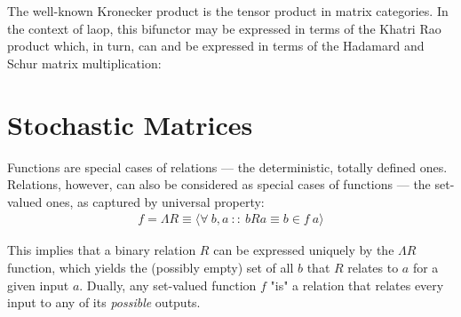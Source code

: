 \documentclass[
  oneside,
  11pt, a4paper,
  footinclude=true,
  headinclude=true,
  cleardoublepage=empty
]{scrbook}
\theoremstyle{definition}
\theoremstyle{definition}
\begin{document}
        \begin{center}
        \end{center}{}
        
        The well-known Kronecker product is the tensor product in matrix categories. In the context of \gls{laop}, this bifunctor may be expressed in terms of the Khatri Rao product which, in turn, can and be expressed in terms of the Hadamard and Schur matrix multiplication:
        
        \begin{center}
        \end{center}{}
        
    \section{Stochastic Matrices}\label{sec-stoch-mat}
    
    Functions are special cases of relations — the deterministic, totally defined ones. Relations, however, can also be considered as special cases of functions — the set-valued ones, as captured by universal property:
    \begin{align}\label{func-rel}
        f = \Lambda R \equiv \langle \forall\ b,a\ ::\ b R a \equiv b \in f\ a \rangle
    \end{align}
    
    \noindent This implies that a binary relation $R$ can be expressed uniquely by the $\Lambda R$ function, which yields the (possibly empty) set of all $b$ that $R$ relates to $a$ for a given input $a$. Dually, any set-valued function $f$ "is" a relation that relates every input to any of its \emph{possible} outputs.
    
\end{document}

